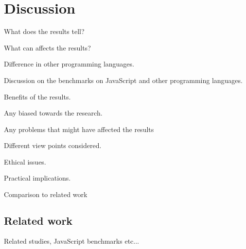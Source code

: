 \chapter{Discussion\label{discussion}}
What does the results tell?

What can affects the results?

Difference in other programming languages.

Discussion on the benchmarks on JavaScript and other programming languages.

Benefits of the results.

Any biased towards the research.

Any problems that might have affected the results

Different view points considered.

Ethical issues.

Practical implications.

Comparison to related work


\section{Related work}
Related studies, JavaScript benchmarks etc...
